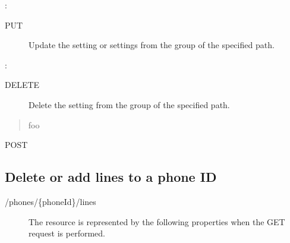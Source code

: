 \documentclass[letterpaper,10pt,english]{sphinxmanual}
\begin{document}
:

\begin{sphinxVerbatim}[commandchars=\\\{\}]
\end{sphinxVerbatim}
\begin{description}
\item[{ PUT}] \leavevmode
Update the setting or settings from the group of the specified path.

\end{description}

:

\begin{sphinxVerbatim}[commandchars=\\\{\}]
\end{sphinxVerbatim}
\begin{description}
\item[{ DELETE}] \leavevmode
Delete the setting from the group of the specified path.

\end{description}

\begin{quote}

foo
\end{quote}

 POST


\subsection{Delete or add lines to a phone ID}
\label{\detokenize{restapi:delete-or-add-lines-to-a-phone-id}}
 /phones/\{phoneId\}/lines
\begin{description}
\item[{}] \leavevmode
The resource is represented by the following properties when the GET request is performed.

\end{description}
\end{document}
